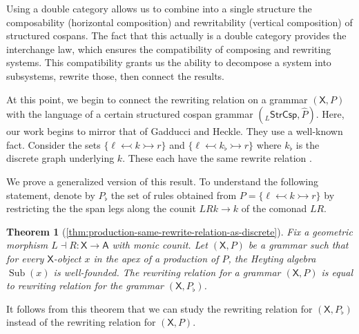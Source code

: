 \documentclass{amsart}
\renewcommand{\hat}[1]{\widehat{#1}}
\newcommand{\A}{\cat{A}}
\newcommand{\X}{\cat{X}}
\newcommand{\StrCsp}{\cat{StrCsp}}
\newcommand{\cat}[1]{\mathsf{#1}}
\newcommand{\from}{\colon}
\newcommand{\monicto}{\rightarrowtail}
\newcommand{\monicgets}{\leftarrowtail}
\DeclareMathOperator{\Sub}{Sub}
\newtheorem*{theorem*}{Theorem}
\theoremstyle{remark}
\theoremstyle{definition}
\begin{document}
Using a double category allows us to combine into a single
structure the composability (horizontal composition) and
rewritability (vertical composition) of structured cospans.
The fact that this actually is a double category
\cite[Lem.~4.2]{CicCour_SpCspTopos} provides the interchange
law, which ensures the compatibility of composing and
rewriting systems. This compatibility grants us the ability
to decompose a system into subsystems, rewrite those, then
connect the results.

At this point, we begin to connect the rewriting relation on
a grammar $ ( \X , P ) $ with the language of a certain
structured cospan grammar $ ( _{L}\StrCsp , \hat{P} )
$. Here, our work begins to mirror that of Gadducci and
Heckle.  They use a well-known fact. Consider the sets
$ \{ \ell \monicgets k \monicto r \} $ and
$ \{ \ell \monicgets k_\flat \monicto r \} $ where
$ k_\flat $ is the discrete graph underlying $ k $.  These
each have the same rewrite relation
\cite[Prop.~3.3]{Ehrig_GraphGram}.

We prove a generalized version of this result. To understand
the following statement, denote by $ P_\flat $ the set of
rules obtained from
$ P = \{ \ell \monicgets k \monicto r \} $ by restricting
the the span legs along the counit $ LRk \to k $ of the
comonad $ LR $.

\begin{theorem*}[\ref{thm:production-same-rewrite-relation-as-discrete}]
  Fix a geometric morphism $ L \dashv R \from \X \to \A $
  with monic counit. Let $ ( \X , P ) $ be a grammar such
  that for every $ \X $-object $ x $ in the apex of a
  production of $ P $, the Heyting algebra $ \Sub (x) $ is
  well-founded.  The rewriting relation for a grammar
  $ ( \X , P ) $ is equal to rewriting relation for the
  grammar $ ( \X , P_{\flat} ) $.
\end{theorem*}

It follows from this theorem that we can study the rewriting
relation for $ ( \X , P_\flat ) $ instead of the rewriting
relation for $ ( \X , P ) $.
\end{document}
